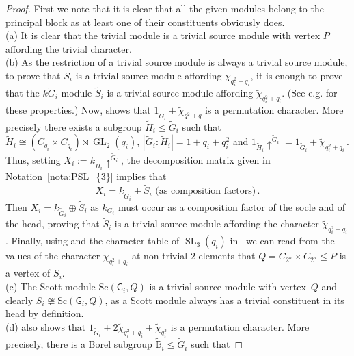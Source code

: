 \documentclass[12pt,a4paper]{amsart}
\theoremstyle{plain}\newtheorem{Theorem}{Theorem}[section]
\theoremstyle{plain}\newtheorem{Conjecture}[Theorem]{Conjecture}
\theoremstyle{plain}\newtheorem{Corollary}[Theorem]{Corollary}
\theoremstyle{plain}\newtheorem{Lemma}[Theorem]{Lemma}
\theoremstyle{plain}\newtheorem{Proposition}[Theorem]{Proposition}
\theoremstyle{definition}\newtheorem{Definition}[Theorem]{Definition}
\theoremstyle{definition}\newtheorem{Example}[Theorem]{Example}
\theoremstyle{definition}\newtheorem{Examples}[Theorem]{Examples}
\theoremstyle{definition}\newtheorem{Remark}[Theorem]{Remark}
\theoremstyle{definition}\newtheorem{Question}[Theorem]{Question}
\theoremstyle{definition}\newtheorem{Notation}[Theorem]{Notation}
\theoremstyle{definition}\newtheorem{Hypothesis}[Theorem]{Hypothesis}
\theoremstyle{definition}\newtheorem{Assumption}[Theorem]{Assumption}
\theoremstyle{definition}\newtheorem{Strategy}[Theorem]{Strategy}
\theoremstyle{definition}\newtheorem{Contents}[Theorem]{Contents}
\theoremstyle{definition}\newtheorem{Computations}[Theorem]{Computations}
\theoremstyle{definition}\newtheorem{Equivalences}[Theorem]{Equivalences}
\theoremstyle{definition}\newtheorem{Notation/Definition}[Theorem]{Notation/Definition}
\theoremstyle{definition}\newtheorem{noth}[Theorem]{}
\theoremstyle{plain}\newtheorem{Step}[Theorem]{Step}
\newcommand{\SL}{\operatorname{SL}}
\newcommand{\GL}{\operatorname{GL}}
\newcommand{\Sc}{{\text{Sc}}}
\begin{document}
\begin{proof}
First we note that it is clear that all the given modules belong to the principal block as at least one of their constituents obviously does. \\
{\rm(a)} 
It is clear that the trivial module is a trivial source module with vertex $P$ affording the trivial character.\\
{\rm(b)}  
As the restriction of a trivial source module is always a trivial source module, to prove that $S_{i}$ is a trivial source module affording $\chi^{}_{q_{i}^2+q_{i}}$, it is enough to prove that the 
$k\widetilde{G}_{i}$-module $\widetilde{S}_{i}$ is a trivial source module affording  $\widetilde\chi^{}_{q_{i}^2+q_{i}}$. (See e.g. \cite[\S4]{Las23} for these properties.)
Now,  \cite[pp.\,228--229]{Ste51} shows that $1_{\widetilde{G}_{i}} + \widetilde\chi_{q^2+q}$ is a permutation character. More precisely
there exists a subgroup $\widetilde H_{i}\leq \widetilde G_{i}$
such that $\widetilde H_{i}\cong (C_{q_{i}}\times C_{q_{i}})\rtimes\GL_2(q_{i})$, $|\widetilde G_{i}:\widetilde H_{i}|=1+q_{i}+q_{i}^2$ and 
${1_{\widetilde H_{i}}}{\uparrow}^{\widetilde G_{i}}= 1_{\widetilde{G}_{i}} + \widetilde\chi_{q_{i}^2+q_{i}}$\,.
Thus, setting $X_{i}:=k_{\widetilde H_{i}}{\uparrow}^{\widetilde G_{i}}$, the decomposition matrix given in Notation~\ref{nota:PSL_{3}} implies that
$$X_{i} = k_{\widetilde G_{i}}+\widetilde S_{i} \text{ (as composition factors)}\,.$$ 
Then $X_{i}=k_{\widetilde G_{i}}\oplus \widetilde S_{i}$  as $k_{G_{i}}$ must 
occur as a composition factor of the socle and of the head, proving that $\widetilde S_{i}$ is a trivial source module affording the character $\widetilde\chi^{}_{q_{i}^2+q_{i}}$.  
Finally, using  \cite[II Lemma 12.6(iii)]{Lan83} and the character table of $\SL_{3}(q_{i})$ in~\cite{SF73} we can read from the values of the character 
$\chi^{}_{q_{i}^2+q_{i}}$ at non-trivial $2$-elements that $Q=C_{2^n}\times C_{2^n}\leq P$ is a vertex of $S_i$. \\
{\rm(c)} 
The Scott module $\Sc(\mathsf{G}_{i},Q)$ is a trivial source module with vertex~$Q$ 
and clearly $S_{i}\ncong \Sc(\mathsf{G}_i,Q)$, as a Scott module always has 
a trivial constituent in its head by definition.\\
{\rm(d)} 
\cite[pp.\,228--229]{Ste51} also shows that  $1_{\widetilde{G}_{i}}+2\widetilde\chi_{q_{i}^2+q_{i}}+\widetilde\chi_{q_{i}^3}$ is a permutation character.
More precisely,  there is a Borel subgroup $\widetilde{\mathbb B}_{i}\leq\widetilde G_{i}$  such that

\end{proof}
\end{document}
